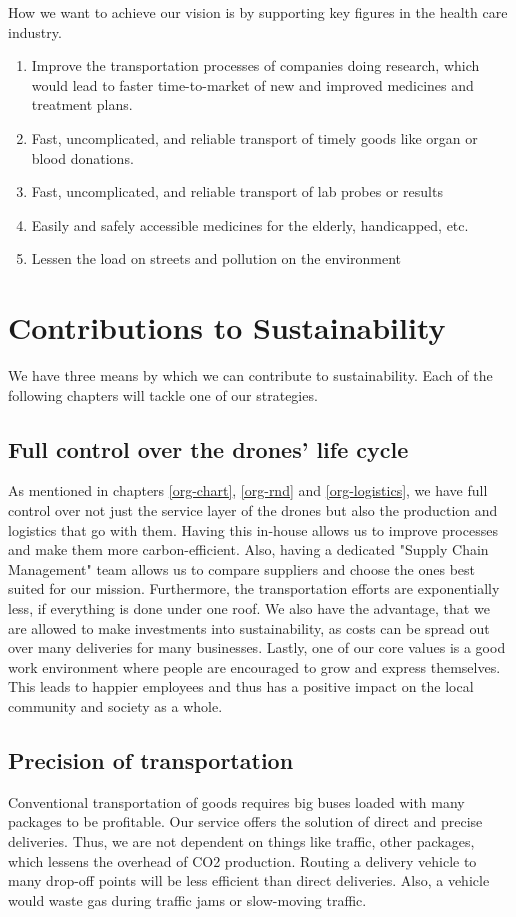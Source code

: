How we want to achieve our vision is by supporting key figures in the health care industry.
\begin{enumerate}
  \item Improve the transportation processes of companies doing research, which would lead to faster time-to-market of new and improved medicines and treatment plans.
  \item Fast, uncomplicated, and reliable transport of timely goods like organ or blood donations.
  \item Fast, uncomplicated, and reliable transport of lab probes or results
  \item Easily and safely accessible medicines for the elderly, handicapped, etc.
  \item Lessen the load on streets and pollution on the environment
\end{enumerate}

\section{Contributions to Sustainability}
We have three means by which we can contribute to sustainability. Each of the following chapters will tackle one of our strategies.
\subsection{Full control over the drones' life cycle}
As mentioned in chapters \ref{org-chart}, \ref{org-rnd} and \ref{org-logistics}, we have full control over not just the service layer of the drones but also the production and logistics that go with them.
\newline
Having this in-house allows us to improve processes and make them more carbon-efficient. Also, having a dedicated "Supply Chain Management" team allows us to compare suppliers and choose the ones best suited for our mission. Furthermore, the transportation efforts are exponentially less, if everything is done under one roof.
\newline
We also have the advantage, that we are allowed to make investments into sustainability, as costs can be spread out over many deliveries for many businesses.
\newline
Lastly, one of our core values is a good work environment where people are encouraged to grow and express themselves. This leads to happier employees and thus has a positive impact on the local community and society as a whole.
\subsection{Precision of transportation}
Conventional transportation of goods requires big buses loaded with many packages to be profitable. Our service offers the solution of direct and precise deliveries. Thus, we are not dependent on things like traffic, other packages, which lessens the overhead of CO2 production. Routing a delivery vehicle to many drop-off points will be less efficient than direct deliveries. Also, a vehicle would waste gas during traffic jams or slow-moving traffic.
